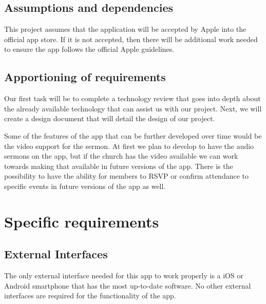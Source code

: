 \documentclass[letterpaper,10pt,draftclsnofoot,onecolumn,compsoc,titlepage]{IEEEtran}
\begin{document}
	\subsection{Assumptions and dependencies}
	This project assumes that the application will be accepted by Apple into the official app store.
	If it is not accepted, then there will be additional work needed to ensure the app follows the official Apple guidelines.

	\subsection{Apportioning of requirements}
	Our first task will be to complete a technology review that goes into depth about the already available technology that can assist us with our project.
	Next, we will create a design document that will detail the design of our project.

	Some of the features of the app that can be further developed over time would be the video support for the sermon.
	At first we plan to develop to have the audio sermons on the app, but if the church has the video available we can work towards making that available in future versions of the app.
	There is the possibility to have the ability for members to RSVP or confirm attendance to specific events in future versions of the app as well.

	\section{Specific requirements}
	\subsection{External Interfaces}
	The only external interface needed for this app to work properly is a iOS or Android smartphone that has the most up-to-date software.
	No other external interfaces are required for the functionality of the app.
\end{document}
